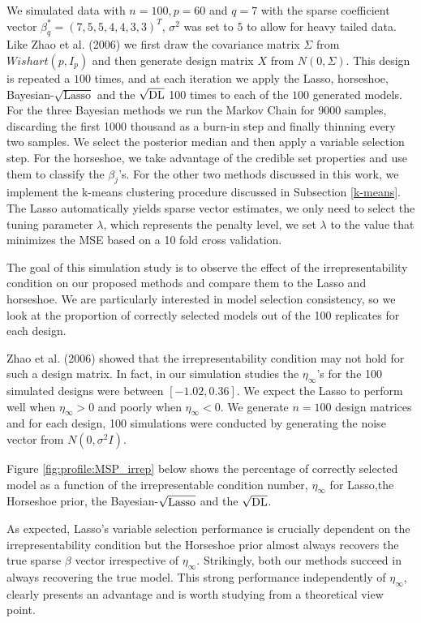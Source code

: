 \documentclass[chapters]{uamaththesis}
\begin{document}
We simulated data with $n = 100, p = 60$ and $q = 7$ with the sparse coefficient vector $\beta_{q}^* = (7,5,5,4,4,3,3)^T$, $\sigma^2$ was set to $5$ to allow for heavy tailed data. Like Zhao et al. (2006) we first draw the covariance matrix $\Sigma$ from $Wishart(p, I_p)$ and then generate design matrix $X$ from $N(0,\Sigma)$. This design is repeated a $100$ times, and at each iteration we apply the Lasso, horseshoe, Bayesian-$\sqrt{\text{Lasso}}$ and the $\sqrt{\text{\rm{DL}}}$ 100 times to each of the $100$ generated models. For the three Bayesian methods we run the Markov Chain for 9000 samples, discarding the first 1000 thousand as a burn-in step and finally thinning every two samples. We select the posterior median and then apply a variable selection step. For the horseshoe, we take advantage of the credible set properties and use them to classify the $\beta_j$'s. For the other two methods discussed in this work, we implement the k-means clustering procedure discussed in Subsection \ref{k-means}. The Lasso automatically yields sparse vector estimates, we only need to select the tuning parameter $\lambda$, which represents the penalty level, we set $\lambda$ to the value that minimizes the MSE based on a 10 fold cross validation.

The goal of this simulation study is to observe the effect of the irrepresentability condition on our proposed methods and compare them to the Lasso and horseshoe. We are particularly interested in model selection consistency, so we look at the proportion of correctly selected models out of the 100 replicates for each design.

Zhao et al. (2006) showed that the irrepresentability condition may not hold for such a design matrix. In fact, in our simulation studies the $\eta_\infty$'s for the 100 simulated designs were between $[-1.02, 0.36]$. We expect the Lasso to perform well when $\eta_\infty>0$ and poorly when $\eta_\infty<0$. We generate $n = 100$ design matrices and for each design, 100 simulations were conducted by generating the noise vector from $N(0, \sigma^2 I)$.

Figure \ref{fig:profile:MSP_irrep} below shows the percentage of correctly selected model as a function of the irrepresentable condition number, $\eta_\infty$ for Lasso,the Horseshoe prior, the Bayesian-$\sqrt{\text{\rm{Lasso}}}$ and the $\sqrt{\text{\rm{DL}}}$.



As expected, Lasso's variable selection performance is crucially dependent on the irrepresentability condition but the Horseshoe prior almost always recovers the true sparse $\beta$ vector irrespective of $\eta_\infty$. Strikingly, both our methods succeed in always recovering the true model. This strong performance independently of  $\eta_\infty$, clearly presents an advantage and is worth studying from a theoretical view point.
\end{document}
